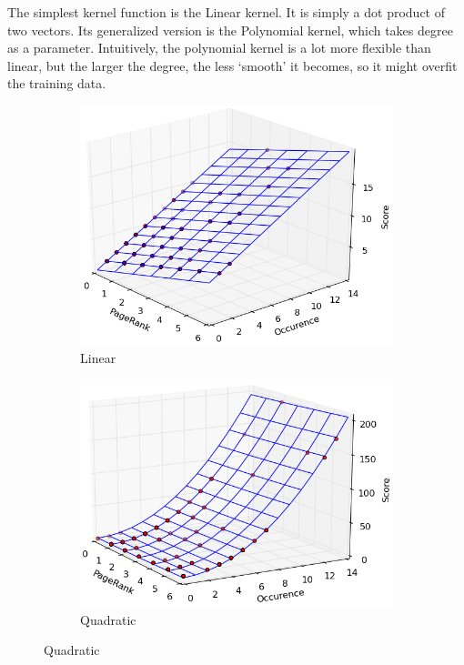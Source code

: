 \documentclass[12pt,a4paper,notitlepage,twoside]{scrbook}
\begin{document}
The simplest kernel function is the Linear kernel. It is simply a dot product
of two vectors. Its generalized version is the Polynomial kernel, which takes
degree as a parameter. Intuitively, the polynomial kernel is a lot more
flexible than linear, but the larger the degree, the less `smooth' it becomes,
so it might overfit the training data.  
\begin{figure}[b!]
\centering
\begin{subfigure}[b]{.49\textwidth}
  \centering
  \includegraphics[width= \linewidth]{figs/lin.png}
  \caption{Linear}
  \label{lin}
\end{subfigure}
\begin{subfigure}[b]{.49\textwidth}
  \centering
  \includegraphics[width=\linewidth]{figs/quad.png}
  \caption{Quadratic}
  \label{quad}
\end{subfigure}


\end{figure}
\end{document}
